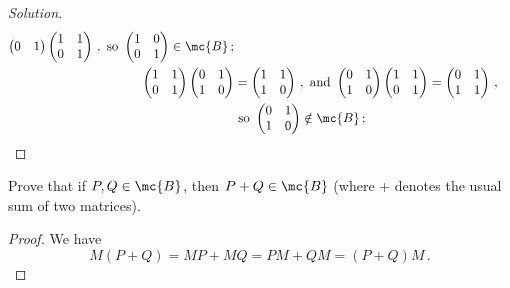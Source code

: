 \begin{proof}[Solution]
\begin{align*}
\begin{pmatrix}
			0 & 1
		\end{pmatrix}
		\begin{pmatrix}
			1 & 1 \\
			0 & 1
		\end{pmatrix}\,,
		\text{ so }	
		\begin{pmatrix}
			1 & 0 \\
			0 & 1
		\end{pmatrix}
		\in \mc{B}\,;
		\\
		\begin{pmatrix}
			1 & 1 \\
			0 & 1
		\end{pmatrix}
		\begin{pmatrix}
			0 & 1 \\
			1 & 0
		\end{pmatrix}
		&=
		\begin{pmatrix}
			1 & 1 \\
			1 & 0
		\end{pmatrix}\,,
		\text{ and }
		\begin{pmatrix}
			0 & 1 \\
			1 & 0
		\end{pmatrix}
		\begin{pmatrix}
			1 & 1 \\
			0 & 1
		\end{pmatrix}
		=
		\begin{pmatrix}
			0 & 1 \\
			1 & 1
		\end{pmatrix}\,,
		\\
		&\text{ so }
		\begin{pmatrix}
			0 & 1 \\
			1 & 0
		\end{pmatrix}
		\notin \mc{B}\,;
	\end{align*}
\end{proof}


\begin{exercise}
	Prove that if $P, Q \in \mc{B}$, then $P + Q \in \mc{B}$ (where + denotes the usual sum of two matrices).
\end{exercise}

\begin{proof}
	We have
	\[
		M(P + Q) = MP + MQ = PM + QM = (P + Q)M\,.
	\]
\end{proof}


